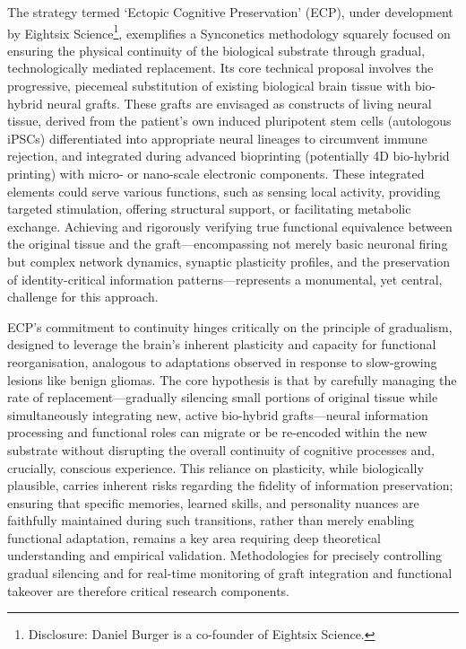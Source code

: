\documentclass[10pt]{article}
\begin{document}
\begin{sloppypar}
  The strategy termed ‘Ectopic Cognitive Preservation’ (ECP), under development by Eightsix Science\footnote{Disclosure: Daniel Burger is a co-founder of Eightsix Science.}, exemplifies a Synconetics methodology squarely focused on ensuring the physical continuity of the biological substrate through gradual, technologically mediated replacement. Its core technical proposal involves the progressive, piecemeal substitution of existing biological brain tissue with bio-hybrid neural grafts. These grafts are envisaged as constructs of living neural tissue, derived from the patient’s own induced pluripotent stem cells (autologous iPSCs) differentiated into appropriate neural lineages to circumvent immune rejection, and integrated during advanced bioprinting (potentially 4D bio-hybrid printing) with micro- or nano-scale electronic components. These integrated elements could serve various functions, such as sensing local activity, providing targeted stimulation, offering structural support, or facilitating metabolic exchange. Achieving and rigorously verifying true functional equivalence between the original tissue and the graft—encompassing not merely basic neuronal firing but complex network dynamics, synaptic plasticity profiles, and the preservation of identity-critical information patterns—represents a monumental, yet central, challenge for this approach.

  ECP’s commitment to continuity hinges critically on the principle of gradualism, designed to leverage the brain’s inherent plasticity and capacity for functional reorganisation, analogous to adaptations observed in response to slow-growing lesions like benign gliomas. The core hypothesis is that by carefully managing the rate of replacement—gradually silencing small portions of original tissue while simultaneously integrating new, active bio-hybrid grafts—neural information processing and functional roles can migrate or be re-encoded within the new substrate without disrupting the overall continuity of cognitive processes and, crucially, conscious experience. This reliance on plasticity, while biologically plausible, carries inherent risks regarding the fidelity of information preservation; ensuring that specific memories, learned skills, and personality nuances are faithfully maintained during such transitions, rather than merely enabling functional adaptation, remains a key area requiring deep theoretical understanding and empirical validation. Methodologies for precisely controlling gradual silencing and for real-time monitoring of graft integration and functional takeover are therefore critical research components.


\end{sloppypar}
\end{document}

